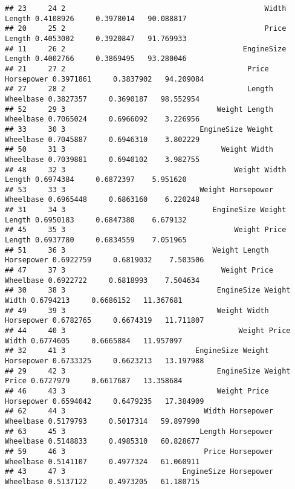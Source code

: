 \documentclass[
]{book}
\begin{document}
\begin{verbatim}
## 23     24 2                                              Width Length 0.4108926     0.3978014   90.088817
## 20     25 2                                              Price Length 0.4053002     0.3920847   91.769933
## 11     26 2                                         EngineSize Length 0.4002766     0.3869495   93.280046
## 21     27 2                                          Price Horsepower 0.3971861     0.3837902   94.209084
## 27     28 2                                          Length Wheelbase 0.3827357     0.3690187   98.552954
## 52     29 3                                   Weight Length Wheelbase 0.7065024     0.6966092    3.226956
## 33     30 3                               EngineSize Weight Wheelbase 0.7045887     0.6946310    3.802229
## 50     31 3                                    Weight Width Wheelbase 0.7039881     0.6940102    3.982755
## 48     32 3                                       Weight Width Length 0.6974384     0.6872397    5.951620
## 53     33 3                               Weight Horsepower Wheelbase 0.6965448     0.6863160    6.220248
## 31     34 3                                  EngineSize Weight Length 0.6950183     0.6847380    6.679132
## 45     35 3                                       Weight Price Length 0.6937780     0.6834559    7.051965
## 51     36 3                                  Weight Length Horsepower 0.6922759     0.6819032    7.503506
## 47     37 3                                    Weight Price Wheelbase 0.6922722     0.6818993    7.504634
## 30     38 3                                   EngineSize Weight Width 0.6794213     0.6686152   11.367681
## 49     39 3                                   Weight Width Horsepower 0.6782765     0.6674319   11.711807
## 44     40 3                                        Weight Price Width 0.6774605     0.6665884   11.957097
## 32     41 3                              EngineSize Weight Horsepower 0.6733325     0.6623213   13.197988
## 29     42 3                                   EngineSize Weight Price 0.6727979     0.6617687   13.358684
## 46     43 3                                   Weight Price Horsepower 0.6594042     0.6479235   17.384909
## 62     44 3                                Width Horsepower Wheelbase 0.5179793     0.5017314   59.897990
## 63     45 3                               Length Horsepower Wheelbase 0.5148833     0.4985310   60.828677
## 59     46 3                                Price Horsepower Wheelbase 0.5141107     0.4977324   61.060911
## 43     47 3                           EngineSize Horsepower Wheelbase 0.5137122     0.4973205   61.180715

\end{verbatim}
\end{document}

